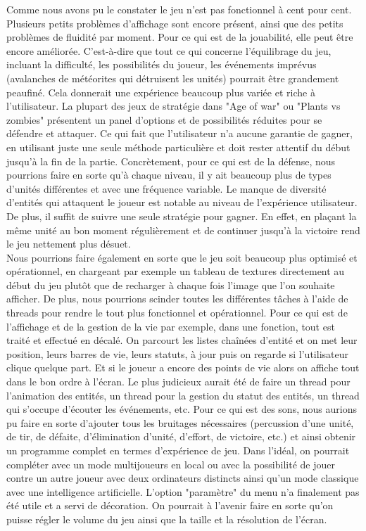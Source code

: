 \documentclass[a4paper,11pt]{article}
\begin{document}
Comme nous avons pu le constater le jeu n'est pas fonctionnel à cent pour cent.\\ Plusieurs petits problèmes d'affichage sont encore présent, ainsi que des petits problèmes de fluidité par moment. Pour ce qui est de la jouabilité, elle peut être encore améliorée. C'est-à-dire que tout ce qui concerne l'équilibrage du jeu, incluant la difficulté, les possibilités du joueur, les événements imprévus (avalanches de météorites qui détruisent les unités) pourrait être grandement peaufiné. Cela donnerait une expérience beaucoup plus variée et riche à l'utilisateur. La plupart des jeux de stratégie dans "Age of war" ou "Plants vs zombies" présentent un panel d'options et de possibilités réduites pour se défendre et attaquer. Ce qui fait que l'utilisateur n'a aucune garantie de gagner, en utilisant juste une seule méthode particulière et doit rester attentif du début jusqu'à la fin de la partie. Concrètement, pour ce qui est de la défense, nous pourrions faire en sorte qu'à chaque niveau, il y ait beaucoup plus de types d'unités différentes et avec une fréquence variable. Le manque de diversité d'entités qui attaquent le joueur est notable au niveau de l'expérience utilisateur. De plus, il suffit de suivre une seule stratégie pour gagner. En effet, en plaçant la même unité au bon moment régulièrement et de continuer jusqu'à la victoire rend le jeu nettement plus désuet.\\
Nous pourrions faire également en sorte que le jeu soit beaucoup plus optimisé et opérationnel, en chargeant par exemple un tableau de textures directement au début du jeu plutôt que de recharger à chaque fois l'image que l'on souhaite afficher. De plus, nous pourrions scinder toutes les différentes tâches à l'aide de threads pour rendre le tout plus fonctionnel et opérationnel. Pour ce qui est de l'affichage et de la gestion de la vie par exemple, dans une fonction, tout est traité et effectué en décalé. On parcourt les listes chaînées d'entité et on met leur position, leurs barres de vie, leurs statuts, à jour puis on regarde si l'utilisateur clique quelque part. Et si le joueur a encore des points de vie alors on affiche tout dans le bon ordre à l'écran. Le plus judicieux aurait été de faire un thread pour l'animation des entités, un thread pour la gestion du statut des entités, un thread qui s'occupe d'écouter les événements, etc. Pour ce qui est des sons, nous aurions pu faire en sorte d'ajouter tous les bruitages nécessaires (percussion d'une unité, de tir, de défaite, d'élimination d'unité, d'effort, de victoire, etc.) et ainsi obtenir un programme complet en termes d'expérience de jeu.
Dans l'idéal, on pourrait compléter avec un mode multijoueurs en local ou avec la possibilité de jouer contre un autre joueur avec deux ordinateurs distincts ainsi qu'un mode classique avec une intelligence artificielle. L'option "paramètre" du menu n'a finalement pas été utile et a servi de décoration. On pourrait à l'avenir faire en sorte qu'on puisse régler le volume du jeu ainsi que la taille et la résolution de l'écran.
\end{document}
